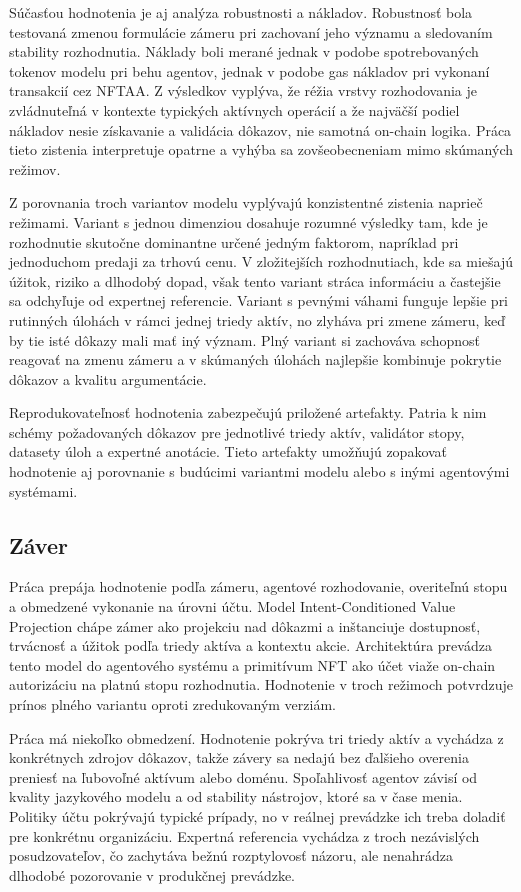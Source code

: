 Súčasťou hodnotenia je aj analýza robustnosti a nákladov. Robustnosť bola testovaná zmenou formulácie zámeru pri zachovaní jeho významu a sledovaním stability rozhodnutia. Náklady boli merané jednak v podobe spotrebovaných tokenov modelu pri behu agentov, jednak v podobe gas nákladov pri vykonaní transakcií cez NFTAA. Z výsledkov vyplýva, že réžia vrstvy rozhodovania je zvládnuteľná v kontexte typických aktívnych operácií a že najväčší podiel nákladov nesie získavanie a validácia dôkazov, nie samotná on-chain logika. Práca tieto zistenia interpretuje opatrne a vyhýba sa zovšeobecneniam mimo skúmaných režimov.

Z porovnania troch variantov modelu vyplývajú konzistentné zistenia naprieč režimami. Variant s jednou dimenziou dosahuje rozumné výsledky tam, kde je rozhodnutie skutočne dominantne určené jedným faktorom, napríklad pri jednoduchom predaji za trhovú cenu. V zložitejších rozhodnutiach, kde sa miešajú úžitok, riziko a dlhodobý dopad, však tento variant stráca informáciu a častejšie sa odchyľuje od expertnej referencie. Variant s pevnými váhami funguje lepšie pri rutinných úlohách v rámci jednej triedy aktív, no zlyháva pri zmene zámeru, keď by tie isté dôkazy mali mať iný význam. Plný variant si zachováva schopnosť reagovať na zmenu zámeru a v skúmaných úlohách najlepšie kombinuje pokrytie dôkazov a kvalitu argumentácie.

Reprodukovateľnosť hodnotenia zabezpečujú priložené artefakty. Patria k nim schémy požadovaných dôkazov pre jednotlivé triedy aktív, validátor stopy, datasety úloh a expertné anotácie. Tieto artefakty umožňujú zopakovať hodnotenie aj porovnanie s budúcimi variantmi modelu alebo s inými agentovými systémami.

\subsection{Záver}

Práca prepája hodnotenie podľa zámeru, agentové rozhodovanie, overiteľnú stopu a obmedzené vykonanie na úrovni účtu. Model Intent-Conditioned Value Projection chápe zámer ako projekciu nad dôkazmi a inštanciuje dostupnosť, trvácnosť a úžitok podľa triedy aktíva a kontextu akcie. Architektúra prevádza tento model do agentového systému a primitívum NFT ako účet viaže on-chain autorizáciu na platnú stopu rozhodnutia. Hodnotenie v troch režimoch potvrdzuje prínos plného variantu oproti zredukovaným verziám.

Práca má niekoľko obmedzení. Hodnotenie pokrýva tri triedy aktív a vychádza z konkrétnych zdrojov dôkazov, takže závery sa nedajú bez ďalšieho overenia preniesť na ľubovoľné aktívum alebo doménu. Spoľahlivosť agentov závisí od kvality jazykového modelu a od stability nástrojov, ktoré sa v čase menia. Politiky účtu pokrývajú typické prípady, no v reálnej prevádzke ich treba doladiť pre konkrétnu organizáciu. Expertná referencia vychádza z troch nezávislých posudzovateľov, čo zachytáva bežnú rozptylovosť názoru, ale nenahrádza dlhodobé pozorovanie v produkčnej prevádzke.

